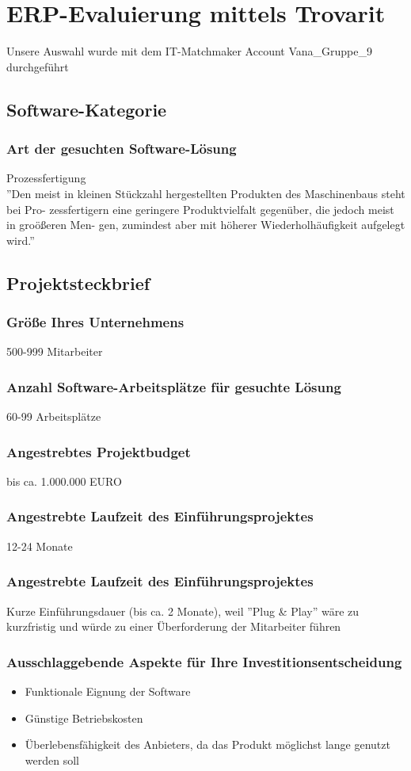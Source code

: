 \section{ERP-Evaluierung mittels Trovarit}
Unsere Auswahl wurde mit dem IT-Matchmaker Account Vana\_Gruppe\_9 durchgeführt


\subsection{Software-Kategorie}
\subsubsection{Art der gesuchten Software-Lösung}
Prozessfertigung\\
''Den meist in kleinen Stückzahl hergestellten Produkten des Maschinenbaus steht bei Pro- zessfertigern eine geringere Produktvielfalt gegenüber, die jedoch meist in groößeren Men- gen, zumindest aber mit höherer Wiederholhäufigkeit aufgelegt wird.'' \cite{trovarit_prozessfertigung}

\subsection{Projektsteckbrief}
\subsubsection{Größe Ihres Unternehmens}
500-999 Mitarbeiter
\subsubsection{Anzahl Software-Arbeitsplätze für gesuchte Lösung}
60-99 Arbeitsplätze
\subsubsection{Angestrebtes Projektbudget}
bis ca. 1.000.000 EURO
\subsubsection{Angestrebte Laufzeit des Einführungsprojektes}
12-24 Monate
\subsubsection{Angestrebte Laufzeit des Einführungsprojektes}
Kurze Einführungsdauer (bis ca. 2 Monate), weil ''Plug \& Play'' wäre zu kurzfristig und würde zu einer Überforderung der Mitarbeiter führen
\subsubsection{Ausschlaggebende Aspekte für Ihre Investitionsentscheidung}
\begin{itemize}
	\item Funktionale Eignung der Software
	\item Günstige Betriebskosten
	\item Überlebensfähigkeit des Anbieters, da das Produkt möglichst lange genutzt werden soll
\end{itemize}
